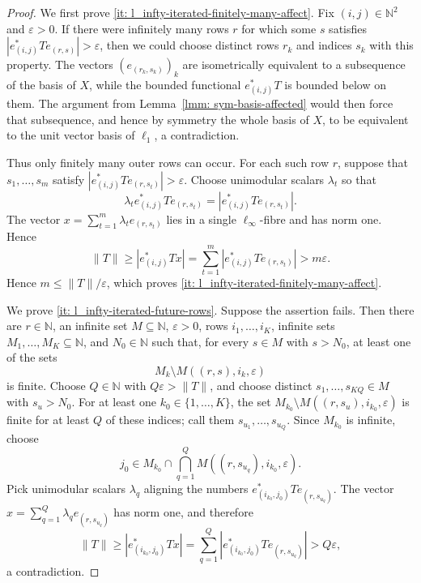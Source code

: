 \documentclass[11pt]{amsart}
\theoremstyle{plain}
\theoremstyle{definition}
\numberwithin{equation}{section}
\newcommand{\N}{\mathbb{N}}
\renewcommand{\leq}{\leqslant}
\renewcommand{\geq}{\geqslant}
\begin{document}
\begin{proof}
    We first prove \ref{it: l_infty-iterated-finitely-many-affect}. Fix $(i,j)\in\N^2$ and $\varepsilon>0$. If there were infinitely many rows $r$ for which some $s$ satisfies $|e_{(i,j)}^*Te_{(r,s)}|>\varepsilon$, then we could choose distinct rows $r_k$ and indices $s_k$ with this property. The vectors $(e_{(r_k,s_k)})_k$ are isometrically equivalent to a subsequence of the basis of $X$, while the bounded functional $e_{(i,j)}^*T$ is bounded below on them. The argument from Lemma~\ref{lmm: sym-basis-affected} would then force that subsequence, and hence by symmetry the whole basis of $X$, to be equivalent to the unit vector basis of $\ell_1$, a contradiction.

    Thus only finitely many outer rows can occur. For each such row $r$, suppose that $s_1,\ldots,s_m$ satisfy $|e_{(i,j)}^*Te_{(r,s_t)}|>\varepsilon$. Choose unimodular scalars $\lambda_t$ so that
    \begin{equation*}
        \lambda_t e_{(i,j)}^*Te_{(r,s_t)}=|e_{(i,j)}^*Te_{(r,s_t)}|.
    \end{equation*}
    The vector $x=\sum_{t=1}^m\lambda_t e_{(r,s_t)}$ lies in a single $\ell_\infty$-fibre and has norm one. Hence
    \begin{equation*}
        \|T\|\geq |e_{(i,j)}^*Tx|
        =\sum_{t=1}^m |e_{(i,j)}^*Te_{(r,s_t)}|
        >m\varepsilon.
    \end{equation*}
    Hence $m\leq \|T\|/\varepsilon$, which proves \ref{it: l_infty-iterated-finitely-many-affect}.

    We prove \ref{it: l_infty-iterated-future-rows}. Suppose the assertion fails. Then there are $r\in\N$, an infinite set $M\subseteq\N$, $\varepsilon>0$, rows $i_1,\ldots,i_K$, infinite sets $M_1,\ldots,M_K\subseteq\N$, and $N_0\in\N$ such that, for every $s\in M$ with $s>N_0$, at least one of the sets
    \begin{equation*}
        M_k\setminus M((r,s),i_k,\varepsilon)
    \end{equation*}
    is finite. Choose $Q\in\N$ with $Q\varepsilon>\|T\|$, and choose distinct $s_1,\dots,s_{KQ}\in M$ with $s_u>N_0$. For at least one $k_0\in\{1,\dots,K\}$, the set $M_{k_0}\setminus M((r,s_u),i_{k_0},\varepsilon)$ is finite for at least $Q$ of these indices; call them $s_{u_1},\dots,s_{u_Q}$. Since $M_{k_0}$ is infinite, choose
    \begin{equation*}
        j_0\in M_{k_0}\cap\bigcap_{q=1}^Q M((r,s_{u_q}),i_{k_0},\varepsilon).
    \end{equation*}
    Pick unimodular scalars $\lambda_q$ aligning the numbers $e_{(i_{k_0},j_0)}^*Te_{(r,s_{u_q})}$. The vector $x=\sum_{q=1}^Q\lambda_q e_{(r,s_{u_q})}$ has norm one, and therefore
    \begin{equation*}
        \|T\|\geq |e_{(i_{k_0},j_0)}^*Tx|
        =\sum_{q=1}^Q |e_{(i_{k_0},j_0)}^*Te_{(r,s_{u_q})}|
        >Q\varepsilon,
    \end{equation*}
    a contradiction.


\end{proof}
\end{document}
